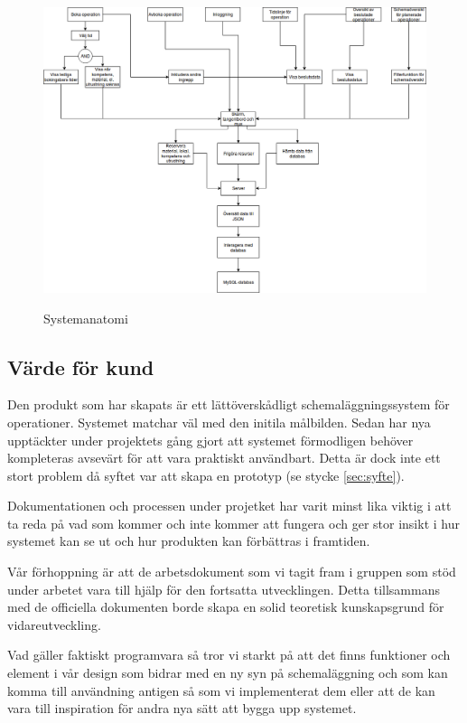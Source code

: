 \begin{figure}[H]
    \includegraphics[width=\textwidth,height=.4\textheight]{Figures/Systemanatomi.png}\\
    \caption{Systemanatomi}
    \label{fig:Systemanatomi}
\end{figure}

\subsection{Värde för kund}
Den produkt som har skapats är ett lättöverskådligt schemaläggningssystem för operationer. Systemet matchar väl med den initila målbilden. Sedan har nya upptäckter under projektets gång gjort att systemet förmodligen behöver kompleteras avsevärt för att vara praktiskt användbart. Detta är dock inte ett stort problem då syftet var att skapa en prototyp (se stycke \ref{sec:syfte}).

Dokumentationen och processen under projetket har varit minst lika viktig i att ta reda på vad som kommer och inte kommer att fungera och ger stor insikt i hur systemet kan se ut och hur produkten kan förbättras i framtiden.

Vår förhoppning är att de arbetsdokument som vi tagit fram i gruppen som stöd under arbetet vara till hjälp för den fortsatta utvecklingen. Detta tillsammans med de officiella dokumenten borde skapa en solid teoretisk kunskapsgrund för vidareutveckling.

Vad gäller faktiskt programvara så tror vi starkt på att det finns funktioner och element i vår design som bidrar med en ny syn på schemaläggning och som kan komma till användning antigen så som vi implementerat dem eller att de kan vara till inspiration för andra nya sätt att bygga upp systemet.

